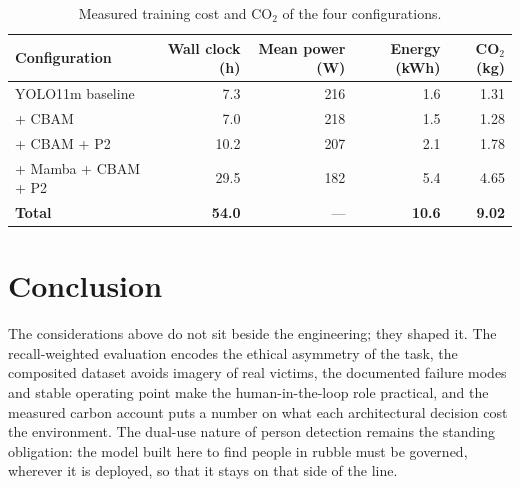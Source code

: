 \begin{table}[tbp]
  \centering
  \caption{Measured training cost and CO$_2$ of the four configurations.}
  \label{tab:carbon}
  \begin{tabular}{@{}l r r r r@{}}
    \toprule
    Configuration & Wall clock (h) & Mean power (W) & Energy (kWh) & CO$_2$ (kg) \\
    \midrule
    YOLO11m baseline    & 7.3  & 216 & 1.6 & 1.31 \\
    + CBAM              & 7.0  & 218 & 1.5 & 1.28 \\
    + CBAM + P2         & 10.2 & 207 & 2.1 & 1.78 \\
    + Mamba + CBAM + P2 & 29.5 & 182 & 5.4 & 4.65 \\
    \midrule
    \textbf{Total}      & \textbf{54.0} & --- & \textbf{10.6} & \textbf{9.02} \\
    \bottomrule
  \end{tabular}
\end{table}

\section{Conclusion}
The considerations above do not sit beside the engineering; they shaped it.
The recall-weighted evaluation encodes the ethical asymmetry of the task, the
composited dataset avoids imagery of real victims, the documented failure
modes and stable operating point make the human-in-the-loop role practical,
and the measured carbon account puts a number on what each architectural
decision cost the environment. The dual-use nature of person detection
remains the standing obligation: the model built here to find people in
rubble must be governed, wherever it is deployed, so that it stays on that
side of the line.
